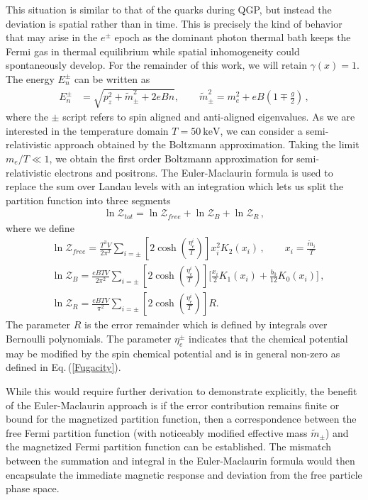 \documentclass[universe,article,submit,moreauthors,pdftex,a4paper]{Definitions/mdpi}
\newcommand{\req}[1]{Eq.\,(\ref{#1})}
\newcommand*{\xblue}{\color{black}}
\begin{document}
This situation is similar to that of the quarks during QGP, but instead the deviation is spatial rather than in time. This is precisely the kind of behavior that may arise in the $e^{\pm}$ epoch as the dominant photon thermal bath keeps the Fermi gas in thermal equilibrium while spatial inhomogeneity could spontaneously develop. For the remainder of this work, we will retain $\gamma(x)=1$. The energy $E_{n}^\pm$ can be written as
\begin{align}
E_{n}^\pm&=\sqrt{p^2_z+\tilde m^2_\pm+2eBn},\qquad\tilde{m}^2_\pm=m^2_e+eB\left(1\mp\frac{g}{2}\right)\,,
\end{align}
where the $\pm$ script refers to spin aligned and anti-aligned eigenvalues. As we are interested in the temperature domain $T=50\ \mathrm{keV}$, we can consider a semi-relativistic approach obtained by the Boltzmann approximation. Taking the limit $m_{e}/T\ll1$, we obtain the first order Boltzmann approximation for semi-relativistic electrons and positrons. The Euler-Maclaurin formula is used to replace the sum over Landau levels with an integration which lets us split the partition function into three segments
\begin{align}
 \ln\mathcal{Z}_{tot}=\ln\mathcal{Z}_{free}+\ln\mathcal{Z}_B+\ln\mathcal{Z}_R\,,
\end{align}
where we define 
\begin{align}
    \label{FreePart}&\ln\mathcal{Z}_{free}=\frac{T^3V}{2\pi^2}\sum_{i=\pm}\left[2\cosh{\left(\frac{\eta_{e}^{i}}{T}\right)}\right]x_i^2K_2\left(x_i\right)\,,\qquad x_i=\frac{\tilde{m}_i}{T}\\
    \label{MagPart}&\ln\mathcal{Z}_B=\frac{eBTV}{2\pi^2}\sum_{i=\pm}\left[2\cosh{\left(\frac{\eta_{e}^{i}}{T}\right)}\right]\bigg[\frac{x_i}{2}K_1\left(x_i\right)+\frac{b_0}{12}K_0\left(x_i\right)\bigg]\,,\\
    \label{ErrorPart}&\ln\mathcal{Z}_R=\frac{eBTV}{\pi^2}\sum_{i=\pm}\left[2\cosh{\left(\frac{\eta_{e}^{i}}{T}\right)}\right]R.
\end{align}
The parameter $R$ is the error remainder which is defined by integrals over Bernoulli polynomials. {\xblue The parameter $\eta_{e}^{\pm}$ indicates that the chemical potential may be modified by the spin chemical potential and is in general non-zero as defined in \req{Fugacity}.}

While this would require further derivation to demonstrate explicitly, the benefit of the Euler-Maclaurin approach is if the error contribution remains finite or bound for the magnetized partition function, then a correspondence between the free Fermi partition function (with noticeably modified effective mass $\tilde{m}_{\pm}$) and the magnetized Fermi partition function can be established. The mismatch between the summation and integral in the Euler-Maclaurin formula would then encapsulate the immediate magnetic response and deviation from the free particle phase space.
\end{document}
